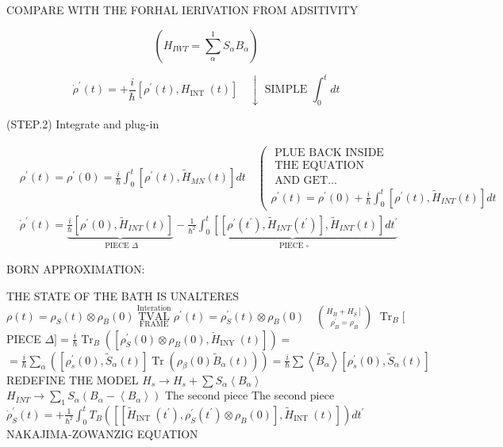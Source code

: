 COMPARE WITH THE
FORHAL IERIVATION FROM ADSITIVITY

$$
\left(H_{IW T}=\sum_{\alpha}^{1} S_{\alpha} B_{\alpha}\right)
$$

$$
\dot{\rho}^{\prime}(t)=+\frac{i}{\hbar}\left[\rho^{\prime}(t), H_{\text {INT }}(t)\right] \quad \downarrow \text { SIMPLE } \int_{0}^{t} d t
$$

(STEP.2) Integrate and plug-in

$$
\begin{aligned}
& \rho^{\prime}(t)=\rho^{\prime}(0)=\frac{i}{\hbar} \int_{0}^{t}\left[\rho^{\prime}(t), \tilde{H}_{M N}(t)\right] d t \quad\left(\begin{array}{c}\text { PLUE BACK INSIDE } \\ \text { THE EQUATION } \\ \text { AND GET... } \\ \rho^{\prime}(t)=\rho^{\prime}(0)+\frac{i}{\hbar} \int_{0}^{t}\left[\rho^{\prime}(t), \tilde{H}_{I N T}(t)\right] d t\end{array}\right. \\
& \dot{\rho}^{\prime}(t)=\underbrace{\frac{i}{\hbar}\left[\rho^{\prime}(0), \tilde{H}_{I N T}(t)\right]}_{\text { PIECE } \Delta}-\underbrace{\frac{1}{\hbar^{2}} \int_{0}^{t}\left[\left[\rho^{\prime}\left(t^{\prime}\right), \tilde{H}_{I N T}\left(t^{\prime}\right)\right], \tilde{H}_{I N T}(t)\right] d t^{\prime}}_{\text { PIECE } \square}
\end{aligned}
$$

BORN APPROXIMATION:

THE STATE OF THE BATH IS UNALTERES
$\rho(t)=\rho_{S}(t) \otimes \rho_{B}(0) \underset{\text { FRAME }}{\stackrel{\text { Interation }}{\text { TVAL }}} \rho^{\prime}(t)=\rho_{S}^{\prime}(t) \otimes \rho_{B}(0) \quad\binom{\left.H_{B}+H_{S}\right]}{\rho_{B}^{\prime}=\rho_{B}}$
$\operatorname{Tr}_{B}[$ PIECE $\Delta]=\frac{i}{\hbar} \operatorname{Tr}_{B}\left(\left[\rho_{S}^{\prime}(0) \otimes \rho_{B}(0), \check{H}_{\text {INY }}(t)\right]\right)=$
$=\frac{i}{\hbar} \sum_{\alpha}\left(\left[\rho_{s}^{\prime}(0), \tilde{S}_{\alpha}(t)\right] \operatorname{Tr}\left(\rho_{\beta}(0) \tilde{B}_{\alpha}(t)\right)\right)=\frac{i}{\hbar} \sum\left\langle\tilde{B}_{\alpha}\right\rangle\left[\rho_{s}^{\prime}(0), \tilde{S}_{\alpha}(t)\right]$
REDEFINE THE MODEL
$H_{s} \rightarrow H_{s}+\sum S_{\alpha}\left\langle B_{\alpha}\right\rangle$
$H_{I N T} \rightarrow \sum_{1} S_{\alpha}\left(B_{\alpha}-\left\langle B_{\alpha}\right\rangle\right)$
The second piece
The second piece
$\dot{\rho}_{S}^{\prime}(t)=+\frac{1}{\hbar^{2}} \int_{0}^{t} T_{B}\left(\left[\left[\tilde{H}_{\text {INT }}\left(t^{\prime}\right), \rho_{S}^{\prime}\left(t^{\prime}\right) \otimes \rho_{B}(0)\right], \tilde{H}_{\text {INT }}(t)\right]\right) d t^{\prime}$ NAKAJIMA-ZOWANZIG EQUATION


